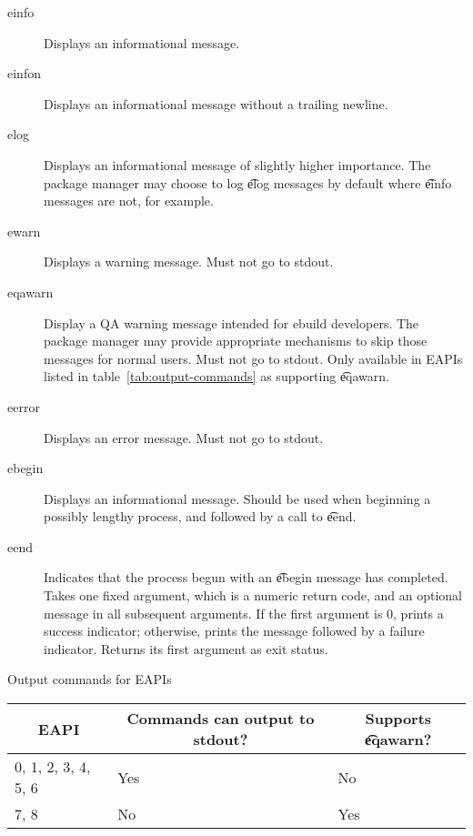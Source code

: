 \begin{description}
\item[einfo] Displays an informational message.
\item[einfon] Displays an informational message without a trailing newline.
\item[elog] Displays an informational message of slightly higher importance. The package
    manager may choose to log \t{elog} messages by default where \t{einfo} messages are not, for
    example.
\item[ewarn] Displays a warning message. Must not go to stdout.
\item[eqawarn]  Display a QA warning message intended for ebuild developers.
    The package manager may provide appropriate mechanisms to skip those messages for normal users.
    Must not go to stdout. Only available in EAPIs listed in table~\ref{tab:output-commands} as
    supporting \t{eqawarn}.
\item[eerror] Displays an error message. Must not go to stdout.
\item[ebegin] Displays an informational message. Should be used when beginning a possibly
    lengthy process, and followed by a call to \t{eend}.
\item[eend] Indicates that the process begun with an \t{ebegin} message has completed. Takes one
    fixed argument, which is a numeric return code, and an optional message in all subsequent
    arguments. If the first argument is 0, prints a success indicator; otherwise, prints the
    message followed by a failure indicator. Returns its first argument as exit status.
\end{description}

\begin{centertable}{Output commands for EAPIs}
    \label{tab:output-commands}
    \begin{tabular}{lll}
      \toprule
      \multicolumn{1}{c}{\textbf{EAPI}} &
      \multicolumn{1}{c}{\textbf{Commands can output to stdout?}} &
      \multicolumn{1}{c}{\textbf{Supports \t{eqawarn}?}} \\
      \midrule
      0, 1, 2, 3, 4, 5, 6 & Yes & No  \\
      7, 8                & No  & Yes \\
      \bottomrule
    \end{tabular}
\end{centertable}

